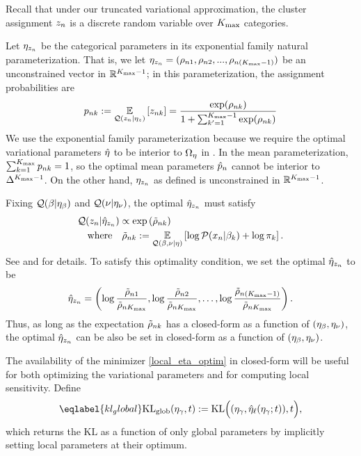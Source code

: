 \begin{ex}
Recall that under our truncated variational approximation,
the cluster assignment $z_n$ is a discrete random variable
over ${K_{\mathrm{max}}}$ categories.

Let $\eta_{z_n}$ be the categorical parameters in its
exponential family natural parameterization.
That is, we let $\eta_{z_n} = (\rho_{n1}, \rho_{n2}, ..., \rho_{n({K_{\mathrm{max}}}-1)})$
be an unconstrained vector in $\mathbb{R}^{{K_{\mathrm{max}}}-1}$;
in this parameterization, the assignment probabilities are
%
\begin{align*}
  p_{nk} := \underset{\mathcal{Q}(z_n \vert \eta_{z})}{\mathbb{E}}\left[z_{nk}\right] =
  \frac{\exp(\rho_{nk})}{1 + \sum_{k'=1}^{{K_{\mathrm{max}}}-1}\exp(\rho_{nk})}
\end{align*}
%
We use the exponential family parameterization because
we require the optimal variational parameters $\hat\eta$
to be interior to $\Omega_{\eta}$ in .
In the mean parameterization,
$\sum_{k=1}^{K_{\mathrm{max}}} p_{nk} = 1$, so the
optimal mean parameters $\hat p_{n}$ cannot be
interior to $\Delta^{{K_{\mathrm{max}}} - 1}$.
On the other hand, $\eta_{z_n}$ as defined
is unconstrained in $\mathbb{R}^{{K_{\mathrm{max}}} - 1}$.

Fixing $\mathcal{Q}(\beta\vert\eta_{\beta})$ and $\mathcal{Q}(\nu\vert\eta_{\nu})$,
the optimal $\hat\eta_{z_n}$ must satisfy
%
\begin{align*}
& \mathcal{Q}(z_n | \hat\eta_{z_n}) \propto \exp\left(\tilde \rho_{nk}\right)\\
& \quad\textrm{where}\quad \tilde \rho_{nk} := \underset{\mathcal{Q}(\beta, \nu \vert \eta)}{\mathbb{E}}\left[\log \mathcal{P}(x_n \vert \beta_k) + \log \pi_k\right].
\end{align*}
%
See \citet{bishop:2006:PRML} and \citet{blei:2017:vi_review} for details.
To satisfy this optimality condition,
we set the optimal $\hat\eta_{z_n}$ to be
%
\begin{align*}
%
\etaopt_{\z_\n} = \left(\log\frac{\tilde\rho_{\n1}}{\tilde\rho_{\n\kmax}},
\log\frac{\tilde\rho_{\n2}}{\tilde\rho_{\n\kmax}}, \ldots,
\log\frac{\tilde\rho_{\n(\kmax-1)}}{\tilde\rho_{\n\kmax}}\right).
%
\end{align*}
%
Thus, as long as the expectation $\tilde\rho_{nk}$ has a closed-form as a function of
$(\eta_{\beta}, \eta_{\nu})$, the optimal $\hat\eta_{z_n}$ can be also be set in closed-form as
a function of $(\eta_{\beta}, \eta_{\nu})$.
%
\end{ex}

The availability of the minimizer \eqref{local_eta_optim}
in closed-form will be useful for both optimizing the variational parameters
and for computing local sensitivity.
Define
\begin{align}\eqlabel{kl_global}
\KLglobal(\eta_\gamma, \t) := \mathrm{KL}\Big((\eta_\gamma, \etaoptlocal(\eta_\gamma; \t)), \t\Big),
\end{align}
which returns the $\mathrm{KL}$ as a function of only global parameters
by implicitly setting local parameters at their optimum.

